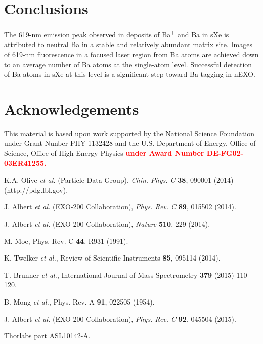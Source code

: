 \documentclass[aps,pra,reprint,superscriptaddress]{revtex4-1}
\begin{document}


\section{Conclusions}

The 619-nm emission peak observed in deposits of Ba\textsuperscript{+} and Ba in sXe is attributed to neutral Ba in a stable and relatively abundant matrix site.
Images of 619-nm fluorescence in a focused laser region from Ba atoms are achieved down to an average number of Ba atoms at the single-atom level.  Successful detection of Ba atoms in sXe at this level is a significant step toward Ba tagging in nEXO. 

\section*{Acknowledgements}

This material is based upon work supported by the National Science Foundation under Grant Nunber PHY-1132428 and the U.S. Department of Energy, Office of Science, Office of High Energy Physics \textbf{\textcolor{red}{under Award Number DE-FG02-03ER41255.}}

%
\begin{thebibliography}{00}
  K.A. Olive \emph{et al.} (Particle Data Group), \emph{Chin. Phys. C} \textbf{38}, 090001 (2014) (http://pdg.lbl.gov).


 J. Albert \emph{et al.} (EXO-200 Collaboration), \emph{Phys. Rev. C} \textbf{89}, 015502 (2014).

 J. Albert \emph{et al.} (EXO-200 Collaboration), \emph{Nature} \textbf{510}, 229 (2014).

 M. Moe, Phys. Rev. C \textbf{44}, R931 (1991).

 K. Twelker \emph{ et al.}, Review of Scientific Instruments \textbf{85}, 095114 (2014).

 T. Brunner \emph{ et al.}, International Journal of Mass Spectrometry {\color{red}\textbf{379} (2015) 110-120.}

 B. Mong \emph{ et al.}, Phys. Rev. A \textbf{91}, 022505 (1954).

 J. Albert \emph{et al.} (EXO-200 Collaboration), \emph{Phys. Rev. C} \textbf{92}, 045504 (2015).

 Thorlabs part ASL10142-A.
\end{thebibliography}
\end{document}
